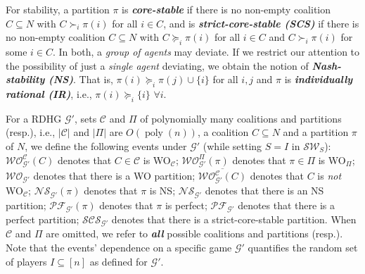 \documentclass[letterpaper]{article} %
\DeclareMathOperator*{\poly}{poly}
\begin{document}
For stability, a partition $\pi$ is \textit{\textbf{core-stable}} if there is no non-empty coalition $C \subseteq N$ with $C \succ_i \pi(i)$ for all $i \in C$, and is \textit{\textbf{strict-core-stable (SCS)}} if there is no non-empty coalition $C\subseteq N$ with $C \succeq_i \pi(i)$ for all $i \in C$ and $C \succ_i \pi(i)$ for some $i \in C$. In both, a \textit{group of agents} may deviate. If we restrict our attention to the possibility of just a \textit{single agent} deviating, we obtain the notion of \textit{\textbf{Nash-stability (NS)}}. That is, $\pi(i) \succeq_i \pi(j) \cup \{i\}$ for all $i,j$ and $\pi$ is \textit{\textbf{individually rational (IR)}}, i.e., $\pi(i) \succeq_i \{i\}$ $\forall i$. %
%

For a RDHG $\mathcal{G}'$, sets $\mathcal{C}$ and $\Pi$ of polynomially many coalitions and partitions (resp.), i.e., $|\mathcal{C}|$ and $|\Pi|$ are $O(\poly(n))$, a coalition $C \subseteq N$ and a partition $\pi$ of $N$, we define the following events under $\mathcal{G}'$ (while setting $S=I$ in $\mathcal{SW}_S$): %
$\mathcal{WO}_{\mathcal{G}'}^{\mathcal{C}}(C)$ denotes that $C \in \mathcal{C}$ is WO$_\mathcal{C}$; $\mathcal{WO}_{\mathcal{G}'}^{\Pi}(\pi)$ denotes that $\pi \in \Pi$ is WO$_\Pi$; $\mathcal{WO}_{\mathcal{G}'}$ denotes that there is a WO partition; $\overline{\mathcal{WO}^{\mathcal{C}}_{\mathcal{G}'}(C)}$ denotes that $C$ is \textit{not} WO$_\mathcal{C}$; %
$\mathcal{NS}_{\mathcal{G}'}(\pi)$ denotes that $\pi$ is NS; $\mathcal{NS}_{\mathcal{G}'}$ denotes that there is an NS partition; $\mathcal{PF}_{\mathcal{G}'}(\pi)$ denotes that $\pi$ is perfect; $\mathcal{PF}_{\mathcal{G}'}$ denotes that there is a perfect partition; %
$\mathcal{SCS}_{\mathcal{G}'}$ denotes that there is a strict-core-stable partition. When $\mathcal{C}$ and $\Pi$ are omitted, we refer to \textbf{\textit{all}} possible coalitions and partitions (resp.). Note that the events' dependence on a specific game $\mathcal{G}'$ quantifies the random set of players $I \subseteq [n]$ as defined for $\mathcal{G}'$.
%
\end{document}
